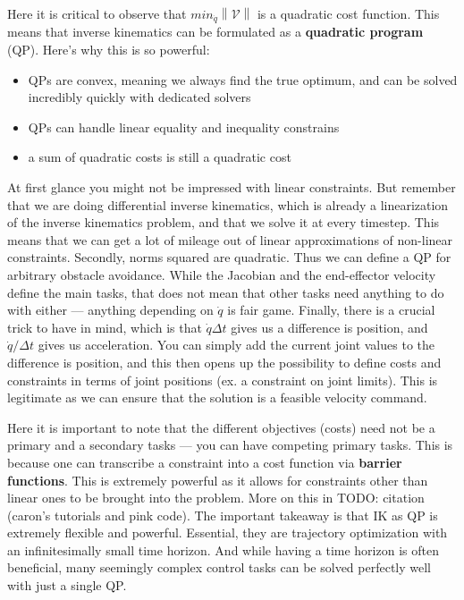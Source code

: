 Here it is critical to observe that $min_{\dot{q}} \left\lVert \mathcal{V}\right \rVert$ is a quadratic cost function.
This means that inverse kinematics can be formulated as a \textbf{quadratic program} (QP).
Here's why this is so powerful: 
\begin{itemize}
\item QPs are convex, meaning we always find the true optimum, and can be solved incredibly quickly with dedicated solvers
\item QPs can handle linear equality and inequality constrains
\item a sum of quadratic costs is still a quadratic cost
\end{itemize}
At first glance you might not be impressed with linear constraints. But remember that we are doing differential
inverse kinematics, which is already a linearization of the inverse kinematics problem,
and that we solve it at every timestep. This means that we can get a lot of mileage out
of linear approximations of non-linear constraints.
Secondly, norms squared are quadratic. Thus we can define a QP for arbitrary obstacle avoidance.
While the Jacobian and the end-effector velocity define the main tasks, that does not mean
that other tasks need anything to do with either --- anything depending on $\dot{q}$ is fair game.
Finally, there is a crucial trick to have in mind, which is that
$\dot{q} \Delta t$ gives us a difference is position,
and $\dot{q}/\Delta  t$ gives us acceleration. 
You can simply add the current joint values to the difference is position,
and this then opens up the possibility to define costs and constraints in terms
of joint positions (ex. a constraint on joint limits).
This is legitimate as we can ensure that the solution is a feasible velocity command.

Here it is important to note that the different objectives (costs) need not be a primary and 
a secondary tasks --- you can have competing primary tasks.
This is because one can transcribe a constraint into a cost function via
\textbf{barrier functions}. This is extremely powerful as it allows
for constraints other than linear ones to be brought into the problem.
More on this in TODO: citation (caron's tutorials and pink code).
The important takeaway is that IK as QP is extremely flexible and powerful.
Essential, they are trajectory optimization with an infinitesimally small time horizon.
And while having a time horizon is often beneficial, many seemingly complex
control tasks can be solved perfectly well with just a single QP.



